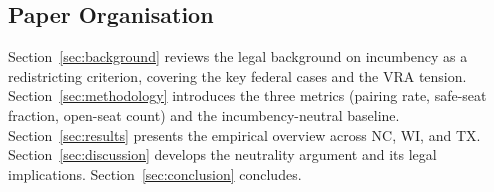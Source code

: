 \subsection{Paper Organisation}

Section~\ref{sec:background} reviews the legal background on incumbency as a
redistricting criterion, covering the key federal cases and the VRA tension.
Section~\ref{sec:methodology} introduces the three metrics (pairing rate, safe-seat
fraction, open-seat count) and the incumbency-neutral baseline.
Section~\ref{sec:results} presents the empirical overview across NC, WI, and TX.
Section~\ref{sec:discussion} develops the neutrality argument and its legal implications.
Section~\ref{sec:conclusion} concludes.
